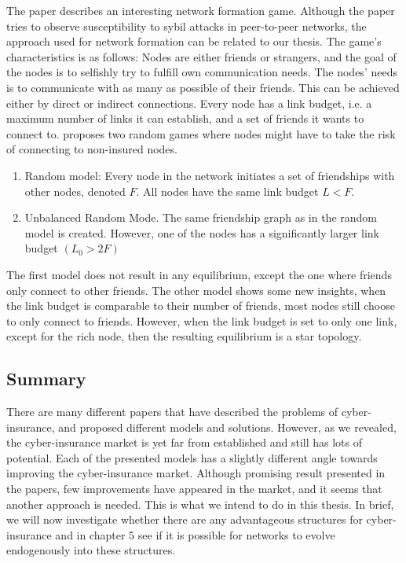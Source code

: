 The paper \cite{danezis2006network} describes an interesting network formation game. Although the paper tries to observe susceptibility to sybil attacks in peer-to-peer networks, the approach used for network formation can be related to our thesis. The game's characteristics is as follows: Nodes are either friends or strangers, and the goal of the nodes is to selfishly try to fulfill own communication needs. The nodes' needs is to communicate with as many as possible of their friends. This can be achieved either by direct or indirect connections. Every node has a link budget, i.e. a maximum number of links it can establish, and a set of friends it wants to connect to. 
\cite{danezis2006network} proposes two random games where nodes might have to take the risk of connecting to non-insured nodes.
\begin{enumerate}
\item Random model: Every node in the network initiates a set of friendships with other nodes, denoted $F$. All nodes have the same link budget $L<F$. 
\item Unbalanced Random Mode. The same friendship graph as in the random model is created. However, one of the nodes has a significantly larger link budget $(L_{0} > 2 F)$
\end{enumerate}
The first model does not result in any equilibrium, except the one where friends only connect to other friends.
The other model shows some new insights, when the link budget is comparable to their number of friends, most nodes still choose to only connect to friends. However, when the link budget is set to only one link, except for the rich node, then the resulting equilibrium is a star topology. 

\subsection{Summary}
There are many different papers that have described the problems of cyber-insurance, and proposed different models and solutions. However, as we revealed, the cyber-insurance market is yet far from established and still has lots of potential. Each of the presented models has a slightly different angle towards improving the cyber-insurance market. Although promising result presented in the papers, few improvements have appeared in the market, and it seems that another approach is needed. This is what we intend to do in this thesis. In brief, we will now investigate whether there are any advantageous structures for cyber-insurance and in chapter 5 see if it is possible for networks to evolve endogenously into these structures.  

